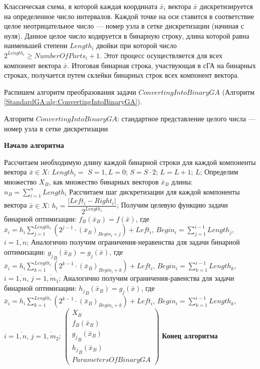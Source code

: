 Классическая схема, в которой каждая координата $ \bar{x}_i $ вектора $ \bar{x} $ дискретизируется на определенное число интервалов. Каждой точке на оси ставится в соответствие целое неотрицательное число --- номер узла в сетке дискретизации (начиная с нуля). Данное целое число кодируется в бинарную строку, длина которой равна наименьшей степени $ Length_i $ двойки  при которой число $ 2^{Length_i}\geq NumberOfParts_i+1 $. Этот процесс осуществляется для всех компонент вектора $ \bar{x} $. Итоговая бинарная строка, участвующая в сГА на бинарных строках, получается путем склейки бинарных строк всех компонент вектора.

Распишем алгоритм преобразования задачи $ ConvertingIntoBinaryGA $ (Алгоритм  \ref{StandardGA:alg:ConvertingIntoBinaryGA}).


\begin{algorithm}
\caption{Алгоритм $ ConvertingIntoBinaryGA $: стандартное представление целого числа --- номер узла в сетке дискретизации}\label{StandardGA:alg:ConvertingIntoBinaryGA}
\begin{algorithmic}
\State \textbf{Начало алгоритма}

\State Рассчитаем необходимую длину каждой бинарной строки для каждой компоненты вектора $ \bar{x}\in X $:
\State $ Length_i= $
\BeginBlock
\State $ S=1, L=0 $;
\State $ S=S\cdot 2 $;
\State $ L=L+1 $;
\EndWhile
\State \Return $ L $;
\EndBlock
\State Определим множество $ X_B $, как множество бинарных векторов $ \bar{x}_B $ длины:  
\State $ n_B=\sum_{i=1}^{n} Length_i$
\State Рассчитаем шаг дискретизации для каждой компоненты вектора  $ \bar{x} \in X $:  
\State $ h_i=\dfrac{\left| Left_i-Right_i\right| }{2^{Length_i}} $;
\State Получим целевую функцию задачи бинарной оптимизации:
\State $ f_B\left( \bar{x}_B\right)=f\left( \bar{x}\right) $, где
\State $ \bar{x}_i=h_i \sum_{j=1}^{Length_i} \left( 2^{j-1}\cdot {\left( \bar{x}_B\right) }_{Begin_i+j} \right)+Left_i $,
\State $ Begin_i =\sum_{j=1}^{i-1}Length_j $, $ i=\overline{1,n} $;
\State Аналогично получим ограничения-неравенства для задачи бинарной оптимизации:
\State $ {g_j}_B\left( \bar{x}_B\right)=g_j\left( \bar{x}\right) $, где
\State $ \bar{x}_i=h_i \sum_{k=1}^{Length_i} \left( 2^{k-1}\cdot {\left( \bar{x}_B\right) }_{Begin_i+k} \right)+Left_i $,
\State $ Begin_i =\sum_{k=1}^{i-1}Length_k $, $ i=\overline{1,n} $, $ j=\overline{1,m_1} $;
\State Аналогично получим ограничения-равенства для задачи бинарной оптимизации:
\State $ {h_j}_B\left( \bar{x}_B\right)=g_j\left( \bar{x}\right) $, где
\State $ \bar{x}_i=h_i \sum_{k=1}^{Length_i} \left( 2^{k-1}\cdot {\left( \bar{x}_B\right) }_{Begin_i+k} \right)+Left_i $,
\State $ Begin_i =\sum_{k=1}^{i-1}Length_k $, $ i=\overline{1,n} $, $ j=\overline{1,m_2} $;
\State \Return $ \left( 
\begin{array}{c}
X_B\\f_B\left( \bar{x}_B\right)\\{g_j}_B\left( \bar{x}_B\right)\\{h_j}_B\left( \bar{x}_B\right)\\ParametersOfBinaryGA
\end{array}
\right)  $
\State \textbf{Конец алгоритма}
\end{algorithmic}
\end{algorithm}
